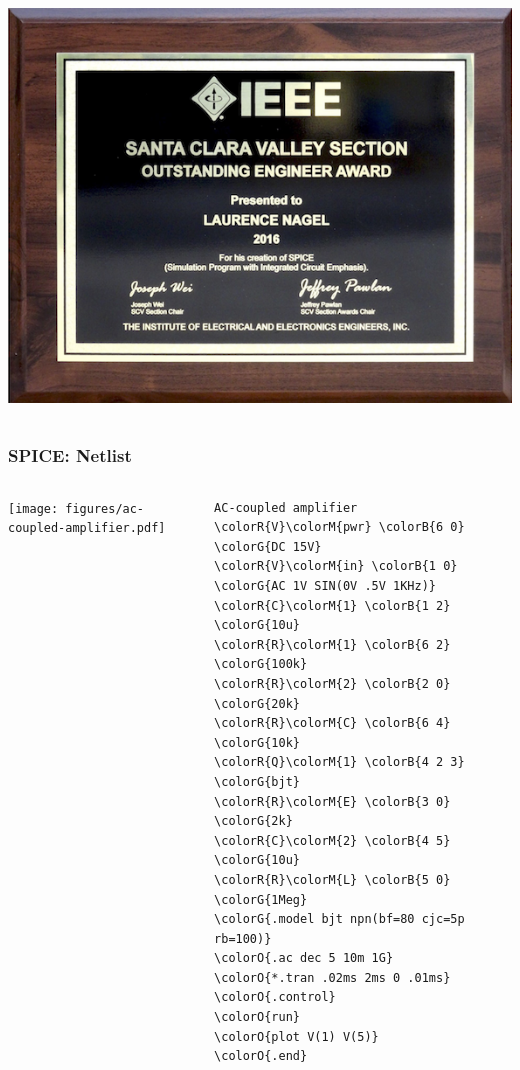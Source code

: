 \begin{frame}
\begin{columns}
\begin{column}{.3\textwidth}
\begin{center}
        \includegraphics[width=.7\textwidth]{images/Nagel_Plaque-SCV-2016.png}
      \end{center}
    \end{column}
  \end{columns}
\end{frame}

\begin{frame}[fragile]
  \frametitle{SPICE: Netlist}
  \begin{columns}
    \begin{column}{.5\textwidth}
      \begin{center}
        \texttt{[image: figures/ac-coupled-amplifier.pdf]}
      \end{center}
    \end{column}
    \begin{column}{.5\textwidth}
      \footnotesize
      \begin{Verbatim}[commandchars=\\\{\}]
AC-coupled amplifier
\colorR{V}\colorM{pwr} \colorB{6 0} \colorG{DC 15V}
\colorR{V}\colorM{in} \colorB{1 0} \colorG{AC 1V SIN(0V .5V 1KHz)}
\colorR{C}\colorM{1} \colorB{1 2} \colorG{10u}
\colorR{R}\colorM{1} \colorB{6 2} \colorG{100k}
\colorR{R}\colorM{2} \colorB{2 0} \colorG{20k}
\colorR{R}\colorM{C} \colorB{6 4} \colorG{10k}
\colorR{Q}\colorM{1} \colorB{4 2 3} \colorG{bjt}
\colorR{R}\colorM{E} \colorB{3 0} \colorG{2k}
\colorR{C}\colorM{2} \colorB{4 5} \colorG{10u}
\colorR{R}\colorM{L} \colorB{5 0} \colorG{1Meg}
\colorG{.model bjt npn(bf=80 cjc=5p rb=100)}
\colorO{.ac dec 5 10m 1G}
\colorO{*.tran .02ms 2ms 0 .01ms}
\colorO{.control}
\colorO{run}
\colorO{plot V(1) V(5)}
\colorO{.end}
      \end{Verbatim}
      \normalsize
    \end{column}
  \end{columns}
\end{frame}

